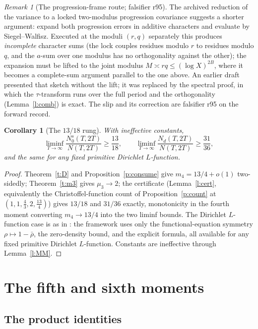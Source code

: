 \documentclass[11pt]{article}
\numberwithin{equation}{section}
\newtheorem{corollary}[theorem]{Corollary}
\theoremstyle{definition}
\theoremstyle{remark}
\newtheorem{remark}[theorem]{Remark}
\begin{document}
\begin{remark}[The progression-frame route; falsifier
r95]\label{rem:prog}
The archived reduction of the variance to a locked two-modulus
progression covariance suggests a shorter argument: expand both
progression errors in additive characters and evaluate by
Siegel--Walfisz. Executed at the moduli $(r,q)$ separately this
produces \emph{incomplete} character sums (the lock couples
residues modulo $r$ to residues modulo $q$, and the $a$-sum over
one modulus has no orthogonality against the other); the
expansion must be lifted to the joint modulus
$M\asymp rq\le(\log X)^{2B}$, where it becomes a complete-sum
argument parallel to the one above. An earlier draft presented
that sketch without the lift; it was replaced by the
spectral proof, in which the $\tau$-transform runs over the full
period and the orthogonality (Lemma~\ref{l:comb}) is exact. The
slip and its correction are falsifier r95 on the forward record.
\end{remark}

\begin{corollary}[The $13/18$ rung]\label{c:1318}
With ineffective constants,
\[
\liminf_{T\to\infty}\frac{N_0^{s}(T,2T)}{N(T,2T)}\ge\frac{13}{18},
\qquad
\liminf_{T\to\infty}\frac{N_d(T,2T)}{N(T,2T)}\ge\frac{31}{36},
\]
and the same for any fixed primitive Dirichlet $L$-function.
\end{corollary}

\begin{proof}
Theorem~\ref{t:D} and Proposition~\ref{p:consume} give
$m_4=13/4+o(1)$ two-sidedly; Theorem~\ref{t:m3} gives $\mu_3\to2$;
the certificate (Lemma~\ref{l:cert}, equivalently the
Christoffel-function count of Proposition~\ref{p:count} at
$(1,1,\tfrac43,2,\tfrac{13}4)$) gives $13/18$ and $31/36$
exactly, monotonicity in the fourth moment converting
$m_4\to13/4$ into the two liminf bounds. The Dirichlet
$L$-function case is as in \cite[Thm.~E]{C26}: the framework
uses only the functional-equation symmetry
$\rho\mapsto1-\bar\rho$, the zero-density bound, and the
explicit formula, all available for any fixed primitive
Dirichlet $L$-function. Constants are
ineffective through Lemma~\ref{l:MM}.
\end{proof}

\section{The fifth and sixth moments}\label{s:five}

\subsection{The product identities}
\end{document}

